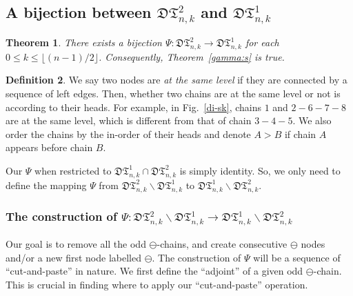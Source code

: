 \documentclass[12pt]{amsart}
\numberwithin{equation}{section}
\theoremstyle{plain}
\newtheorem{theorem}{Theorem}[section]
\theoremstyle{definition}
\newtheorem{Def}[theorem]{Definition}
\def\D{\mathfrak{D}}
\def\T{\mathfrak{T}}
\begin{document}
\subsection{A bijection between $\D\T_{n,k}^{2}$ and $\D\T_{n,k}^{1}$}

 
\begin{theorem}\label{gammabij}
There exists a bijection $\Psi:\D\T_{n,k}^{2}\rightarrow\D\T_{n,k}^{1}$ for each $0\leq k\leq\lfloor(n-1)/2\rfloor$. Consequently, Theorem~\ref{gamma:s} is true.
\end{theorem}


\begin{Def}
We say two nodes are {\em at the same level} if they are connected by a sequence of left edges. Then, whether two chains are at the same level or not is according to their heads. For example, in Fig.~\ref{di-sk},  chains $1$ and $2-6-7-8$ are at the same level, which is different from that of chain $3-4-5$.  We also order the chains by the in-order of their heads and denote $A>B$ if chain $A$ appears before  chain $B$. 
\end{Def}

Our $\Psi$ when restricted to $\D\T^{1}_{n,k}\cap \D\T^{2}_{n,k}$ is simply identity. So, we only need to define the mapping $\Psi$ from  $\D\T^{2}_{n,k}\backslash \D\T^{1}_{n,k}$ to $\D\T^{1}_{n,k}\backslash \D\T^{2}_{n,k}$. 




\subsubsection{The construction of $\Psi:\D\T^{2}_{n,k}\backslash \D\T^{1}_{n,k}\rightarrow\D\T^{1}_{n,k}\backslash \D\T^{2}_{n,k}$}


Our goal is to remove all the odd $\ominus$-chains, and create consecutive $\ominus$ nodes and/or a new first node labelled $\ominus$. The construction of $\Psi$ will be a sequence of ``cut-and-paste'' in nature. We first define the ``adjoint'' of a given odd $\ominus$-chain. This is crucial in finding where to apply our ``cut-and-paste'' operation.
\end{document}
